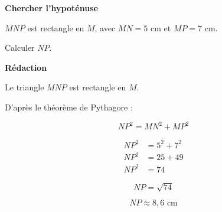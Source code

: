 \documentclass[12pt,a4paper]{article}
\begin{document}
\noindent
\begin{minipage}[t]{0.485\textwidth}
\vspace{0pt}

\begin{tcolorbox}[
  enhanced,
  colback=white,
  colframe=ActionC!55,
  boxrule=0.6pt,
  arc=2mm,
  left=3mm,
  right=3mm,
  top=1.5mm,
  bottom=1.5mm
]

{\sffamily\bfseries\color{ActionC}
Chercher l'hypoténuse}

\smallskip

\(MNP\) est rectangle en \(M\), avec
\(MN=5\) cm et \(MP=7\) cm.

Calculer \(NP\).

\smallskip

\textbf{Rédaction}

\smallskip

Le triangle \(MNP\) est rectangle en \(M\).

D'après le théorème de Pythagore :

\[
NP^2=MN^2+MP^2
\]

\[
\begin{aligned}
NP^2 &= 5^2+7^2\\
NP^2 &= 25+49\\
NP^2 &= 74
\end{aligned}
\]

\[
NP=\sqrt{74}
\]

\[
\boxed{NP\approx8{,}6\text{ cm}}
\]

\end{tcolorbox}

\end{minipage}
\hfill
%
\end{document}
